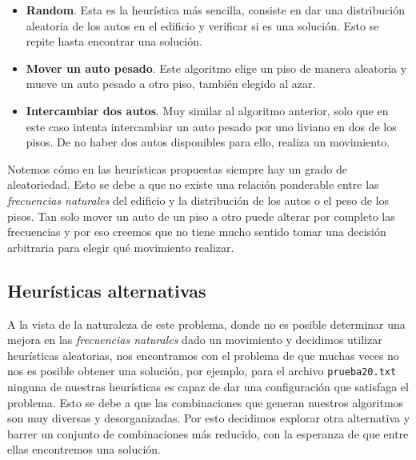 \documentclass[a4paper]{article}
\begin{document}
\begin{itemize}
  \item \textbf{Random}. Esta es la heurística más sencilla, consiste en dar una distribución aleatoria de los autos en el edificio y verificar si es una solución. Esto se repite hasta encontrar una solución.
  \item \textbf{Mover un auto pesado}. Este algoritmo elige un piso de manera aleatoria y mueve un auto pesado a otro piso, también elegido al azar.
  \item \textbf{Intercambiar dos autos}. Muy similar al algoritmo anterior, solo que en este caso intenta intercambiar un auto pesado por uno liviano en dos de los pisos. De no haber dos autos disponibles para ello, realiza un movimiento.
\end{itemize}

Notemos cómo en las heurísticas propuestas siempre hay un grado de aleatoriedad. Esto se debe a que no existe una relación ponderable entre las \textit{frecuencias naturales} del edificio y la  distribución de los autos o el peso de los pisos. Tan solo mover un auto de un piso a otro puede alterar por completo las frecuencias y por eso creemos que no tiene mucho sentido tomar una decisión arbitraria para elegir qué movimiento realizar. 

\subsection{Heurísticas alternativas}

A la vista de la naturaleza de este problema, donde no es posible determinar una mejora en las \textit{frecuencias naturales} dado un movimiento y decidimos utilizar heurísticas aleatorias, nos encontramos con el problema de que muchas veces no nos es posible obtener una solución, por ejemplo, para el archivo \texttt{prueba20.txt} ninguna de nuestras heurísticas es capaz de dar una configuración que satisfaga el problema. Esto se debe a que las combinaciones que generan nuestros algoritmos son muy diversas y desorganizadas. Por esto decidimos explorar otra alternativa y barrer un conjunto de combinaciones más reducido, con la esperanza de que entre ellas encontremos una solución.
\end{document}
